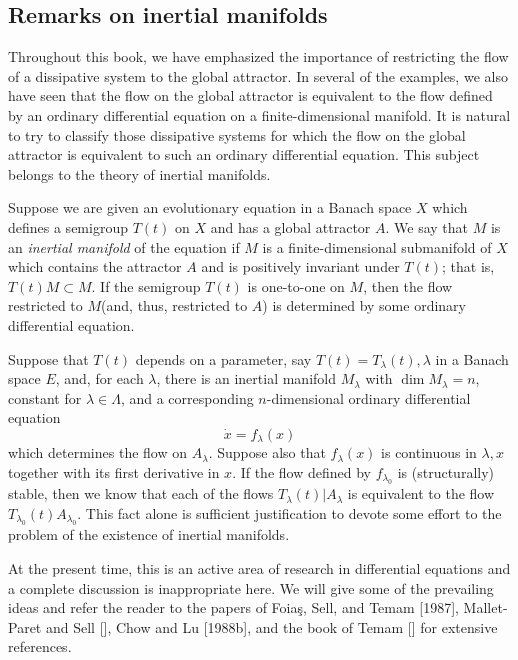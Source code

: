 \documentclass{surv-l}
\theoremstyle{plain}
\theoremstyle{definition}
\numberwithin{equation}{section}
\numberwithin{figure}{chapter}
\begin{document}
\subsection{Remarks on inertial manifolds}\label{subsec4.10.5} Throughout this book, we have emphasized the importance of restricting the flow of a dissipative system to the global attractor. In several of the examples, we also have seen that the flow on the global attractor is equivalent to the flow defined by an ordinary differential equation on a finite-dimensional manifold. It is natural to try to classify those dissipative systems for which the flow on the global attractor is equivalent to such an ordinary differential equation. This subject belongs to the theory of inertial manifolds.

Suppose we are given an evolutionary equation in a Banach space $X$ which defines a semigroup $T(t)$ on $X$ and has a global attractor $A$. We say that $M$ is an \emph{inertial manifold} of the equation if $M$ is a finite-dimensional submanifold of $X$ which contains the attractor $A$ and is positively invariant under $T(t)$; that is, $T(t)M\subset M$. If the semigroup $T(t)$ is one-to-one on $M$, then the flow restricted to $M$(and, thus, restricted to $A$) is determined by some ordinary differential equation.

Suppose that $T(t)$ depends on a parameter, say $T(t)=T_{\lambda}(t),\lambda$ in a Banach space $E$, and, for each $\lambda$, there is an inertial manifold $M_{\lambda}$ with $\dim M_{\lambda}=n$, constant for $\lambda\in\Lambda$, and a corresponding $n$-dimensional ordinary differential equation
\begin{equation*}
\dot{x}=f_{\lambda}(x)
\end{equation*}
which determines the flow on $A_{\lambda}$. Suppose also that $f_{\lambda}(x)$ is continuous in $\lambda,x$ together with its first derivative in $x$. If the flow defined by $f_{\lambda_{0}}$ is (structurally) stable, then we know that each of the flows $T_{\lambda}(t)|A_{\lambda}$ is equivalent to the flow $T_{\lambda_{0}}(t)A_{\lambda_{0}}$. This fact alone is sufficient justification to devote some effort to the problem of the existence of inertial manifolds.

At the present time, this is an active area of research in differential equations and a complete discussion is inappropriate here. We will give some of the prevailing ideas and refer the reader to the papers of Foia\c{s}, Sell, and Temam [1987], Mallet-Paret and Sell [\citeyear{1988m}], Chow and Lu [1988b], and the book of Temam [\citeyear{1988t}] for extensive references.
\end{document}
